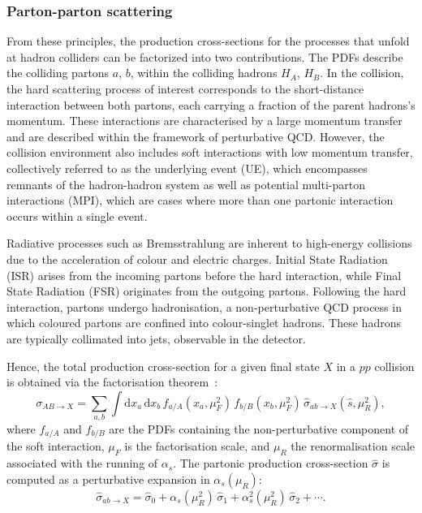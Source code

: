 \subsubsection*{Parton-parton scattering}
\label{subsubsec:proton}
From these principles, the production cross-sections for the processes that unfold at hadron colliders can be factorized into two contributions. The PDFs describe the colliding partons $a$, $b$, within the colliding hadrons $H_{A}$, $H_{B}$. In the collision, the hard scattering process of interest corresponds to the short-distance interaction between both partons, each carrying a fraction of the parent hadrons's momentum. These interactions are characterised by a large momentum transfer and are described within the framework of perturbative QCD. However, the collision environment also includes soft interactions with low momentum transfer, collectively referred to as the underlying event (UE), which encompasses remnants of the hadron-hadron system as well as potential multi-parton interactions (MPI), which are cases where more than one partonic interaction occurs within a single event.

Radiative processes such as Bremsstrahlung are inherent to high-energy collisions due to the acceleration of colour and electric charges. Initial State Radiation (ISR) arises from the incoming partons before the hard interaction, while Final State Radiation (FSR) originates from the outgoing partons. Following the hard interaction, partons undergo hadronisation, a non-perturbative QCD process in which coloured partons are confined into colour-singlet hadrons. These hadrons are typically collimated into jets, observable in the detector.

Hence, the total production cross-section for a given final state $X$ in a $pp$ collision is obtained via the factorisation theorem~\cite{fact_them,collins2004factorizationhardprocessesqcd}:
\begin{equation}
\sigma_{AB \to X} = \sum_{a,b} \int \mathrm{d}x_a \, \mathrm{d}x_b \, f_{a/A}(x_a, \mu_F^2) \, f_{b/B}(x_b, \mu_F^2) \, \hat{\sigma}_{ab \to X}(\hat{s}, \mu_R^2),
\end{equation}
where $f_{a/A}$ and $f_{b/B}$ are the PDFs containing the non-perturbative component of the soft interaction, $\mu_F$ is the factorisation scale, and $\mu_R$ the renormalisation scale associated with the running of $\alpha_s$. The partonic production cross-section $\hat{\sigma}$ is computed as a perturbative expansion in $\alpha_s(\mu_R)$:
\begin{equation}
\hat{\sigma}_{ab \to X} = \hat{\sigma}_0 + \alpha_s(\mu_R^2)\, \hat{\sigma}_1 + \alpha_s^2(\mu_R^2)\, \hat{\sigma}_2 + \cdots.
\label{running}
\end{equation}

